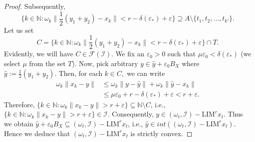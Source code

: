 \documentclass[reqno]{amsart}
\begin{document}
{\begin{proof}
	Subsequently, 
	\begin{equation}\label{Eq 2}
		\{k\in\mathbb{N}:\omega_k\|\frac{1}{2}(y_1+y_2)-x_{k}\|<r-\delta(\varepsilon_*) +\varepsilon\}\supseteq A\setminus\{t_1,t_2,...,t_{k'}\}.
	\end{equation}
    Let us set
	 $$
	 C=\{k\in\mathbb{N}:\omega_k\|\frac{1}{2}(y_1+y_2)-x_{k}\|<r-\delta(\varepsilon_*) +\varepsilon\}\cap T
	 .$$ 
	 Evidently, we will have $C\in\mathcal{F}(\mathcal{I})$.
	We fix an $\varepsilon_0>0$ such that $\mu\varepsilon_0<\delta(\varepsilon_*)$ (we select $\mu$ from the set $T$).	Now, pick arbitrary $y\in \hat{y}+\varepsilon_0B_X$ where $	\hat{y}:=\frac{1}{2}(y_1+y_2).$ Then, for each $k\in C,$ we can write
	\begin{align*}
		\omega_k\|x_k-y\|&\leq \omega_k\|y-\hat{y}\|+ \omega_k\|\hat{y}-x_k\|\\
		&\leq \mu\varepsilon_0+r-\delta(\varepsilon_*)+\varepsilon< r+\varepsilon.
	\end{align*}
	Therefore, $\{k\in\mathbb{N}:\omega_k\|x_k-y\|>r+\varepsilon\}\subseteq \mathbb{N}\setminus C$, i.e., $\{k\in\mathbb{N}:\omega_k\|x_k-y\|>r+\varepsilon\}\in\mathcal{I}$. Consequently, $y\in (\omega_t,\mathcal{I})-\text{LIM}^{r} x_t$.  
Thus we obtain  $\hat{y}+\varepsilon_0B_X\subseteq(\omega_t,\mathcal{I})-\text{LIM}^{r} x_t$, i.e., $\hat{y}\in int((\omega_t,\mathcal{I})-\text{LIM}^{r} x_t)$.  Hence we deduce that  $(\omega_t,\mathcal{I})-\text{LIM}^{r} x_t$ is strictly convex.
 \end{proof}

}
\end{document}
